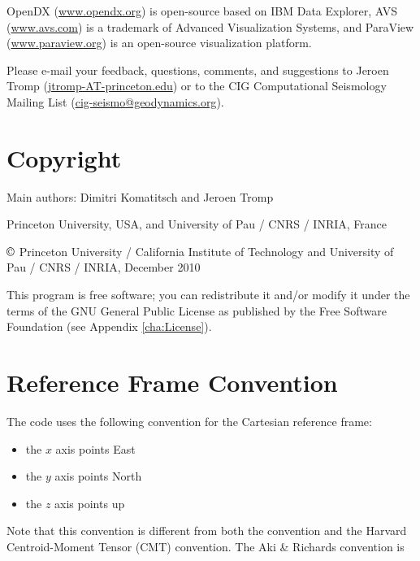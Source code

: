\documentclass[oneside,english]{book}
\newcommand{\urlwithparentheses}[1]{(\url{#1})}
\begin{document}
OpenDX \urlwithparentheses{www.opendx.org} is open-source based on IBM Data Explorer,
AVS \urlwithparentheses{www.avs.com} is a trademark of Advanced Visualization Systems,
and ParaView \urlwithparentheses{www.paraview.org} is an open-source visualization
platform.{\small{} }{\small \par}

Please e-mail your feedback, questions, comments, and suggestions
to Jeroen Tromp \urlwithparentheses{jtromp-AT-princeton.edu} or to the CIG Computational Seismology Mailing List \urlwithparentheses{cig-seismo@geodynamics.org}.


\chapter*{\label{cha:Copyright}Copyright}

Main authors: Dimitri Komatitsch and Jeroen Tromp

Princeton University, USA,
and University of Pau / CNRS / INRIA, France

$\copyright$ Princeton University / California Institute of Technology and University of Pau / CNRS / INRIA, December 2010

This program is free software; you can redistribute it and/or modify
it under the terms of the GNU General Public License as published
by the Free Software Foundation (see Appendix \ref{cha:License}).

{\small 
}{\small \par}

\appendix

\chapter{\label{cha:Reference-Frame-Convention}Reference Frame Convention}

The code uses the following convention for the Cartesian reference frame:

\begin{itemize}
\item the $x$ axis points East
\item the $y$ axis points North
\item the $z$ axis points up
\end{itemize}
Note that this convention is different from both the \citet{AkRi80}
convention and the Harvard Centroid-Moment Tensor (CMT) convention.
The Aki \& Richards convention is
\end{document}
